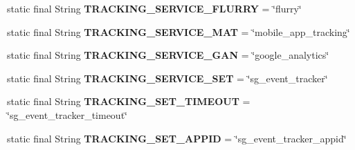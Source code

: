 \begin{DoxyCompactItemize}
\item 
\hypertarget{classcom_1_1spilgames_1_1framework_1_1core_1_1_spil_constants_af407005bdd5fe0fa6c55184d515cf410}{static final String {\bfseries T\-R\-A\-C\-K\-I\-N\-G\-\_\-\-S\-E\-R\-V\-I\-C\-E\-\_\-\-F\-L\-U\-R\-R\-Y} = \char`\"{}flurry\char`\"{}}\label{classcom_1_1spilgames_1_1framework_1_1core_1_1_spil_constants_af407005bdd5fe0fa6c55184d515cf410}

\item 
\hypertarget{classcom_1_1spilgames_1_1framework_1_1core_1_1_spil_constants_a44c0e18f586a883ae95939e86cff7e58}{static final String {\bfseries T\-R\-A\-C\-K\-I\-N\-G\-\_\-\-S\-E\-R\-V\-I\-C\-E\-\_\-\-M\-A\-T} = \char`\"{}mobile\-\_\-app\-\_\-tracking\char`\"{}}\label{classcom_1_1spilgames_1_1framework_1_1core_1_1_spil_constants_a44c0e18f586a883ae95939e86cff7e58}

\item 
\hypertarget{classcom_1_1spilgames_1_1framework_1_1core_1_1_spil_constants_a632eff222f4685fe58b7890a2f4df41b}{static final String {\bfseries T\-R\-A\-C\-K\-I\-N\-G\-\_\-\-S\-E\-R\-V\-I\-C\-E\-\_\-\-G\-A\-N} = \char`\"{}google\-\_\-analytics\char`\"{}}\label{classcom_1_1spilgames_1_1framework_1_1core_1_1_spil_constants_a632eff222f4685fe58b7890a2f4df41b}

\item 
\hypertarget{classcom_1_1spilgames_1_1framework_1_1core_1_1_spil_constants_aa26945f5594e9f3dbee8993ef40881d6}{static final String {\bfseries T\-R\-A\-C\-K\-I\-N\-G\-\_\-\-S\-E\-R\-V\-I\-C\-E\-\_\-\-S\-E\-T} = \char`\"{}sg\-\_\-event\-\_\-tracker\char`\"{}}\label{classcom_1_1spilgames_1_1framework_1_1core_1_1_spil_constants_aa26945f5594e9f3dbee8993ef40881d6}

\item 
\hypertarget{classcom_1_1spilgames_1_1framework_1_1core_1_1_spil_constants_a1a80e2ff506fc41ed13fba77edeebdc0}{static final String {\bfseries T\-R\-A\-C\-K\-I\-N\-G\-\_\-\-S\-E\-T\-\_\-\-T\-I\-M\-E\-O\-U\-T} = \char`\"{}sg\-\_\-event\-\_\-tracker\-\_\-timeout\char`\"{}}\label{classcom_1_1spilgames_1_1framework_1_1core_1_1_spil_constants_a1a80e2ff506fc41ed13fba77edeebdc0}

\item 
\hypertarget{classcom_1_1spilgames_1_1framework_1_1core_1_1_spil_constants_af99b0e5f8009583b141081ffcfa6aacf}{static final String {\bfseries T\-R\-A\-C\-K\-I\-N\-G\-\_\-\-S\-E\-T\-\_\-\-A\-P\-P\-I\-D} = \char`\"{}sg\-\_\-event\-\_\-tracker\-\_\-appid\char`\"{}}\label{classcom_1_1spilgames_1_1framework_1_1core_1_1_spil_constants_af99b0e5f8009583b141081ffcfa6aacf}


\end{DoxyCompactItemize}
